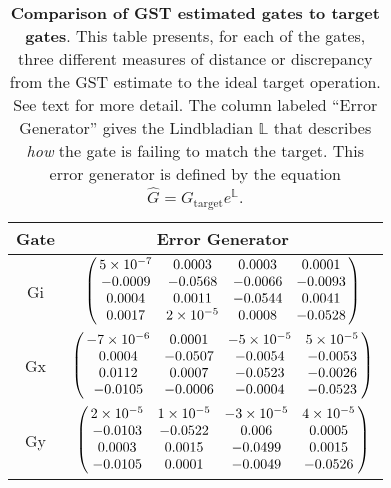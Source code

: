 {\begin{table}[h]
\begin{center}
\vspace{2em}
\begin{tabular}[l]{|c|c|}
\hline
Gate & Error Generator \\ \hline
Gi & $ \left(\!\!\begin{array}{cccc}
5\times 10^{-7} & 0.0003 & 0.0003 & 0.0001 \\ 
-0.0009 & -0.0568 & -0.0066 & -0.0093 \\ 
0.0004 & 0.0011 & -0.0544 & 0.0041 \\ 
0.0017 & 2\times 10^{-5} & 0.0008 & -0.0528
 \end{array}\!\!\right) $
 \\ \hline
Gx & $ \left(\!\!\begin{array}{cccc}
-7\times 10^{-6} & 0.0001 & -5\times 10^{-5} & 5\times 10^{-5} \\ 
0.0004 & -0.0507 & -0.0054 & -0.0053 \\ 
0.0112 & 0.0007 & -0.0523 & -0.0026 \\ 
-0.0105 & -0.0006 & -0.0004 & -0.0523
 \end{array}\!\!\right) $
 \\ \hline
Gy & $ \left(\!\!\begin{array}{cccc}
2\times 10^{-5} & 1\times 10^{-5} & -3\times 10^{-5} & 4\times 10^{-5} \\ 
-0.0103 & -0.0522 & 0.006 & 0.0005 \\ 
0.0003 & 0.0015 & -0.0499 & 0.0015 \\ 
-0.0105 & 0.0001 & -0.0049 & -0.0526
 \end{array}\!\!\right) $
 \\ \hline
\end{tabular}

\caption{\textbf{Comparison of GST estimated gates to target gates}.  This table presents, for each of the gates, three different measures of distance or discrepancy from the GST estimate to the ideal target operation.  See text for more detail.  The column labeled ``Error Generator'' gives the Lindbladian $\mathbb{L}$ that describes \emph{how} the gate is failing to match the target.  This error generator is defined by the equation $\hat{G} = G_{\mathrm{target}}e^{\mathbb{L}}$. \label{bestCPTPGatesetVsTargetTable}}
\end{center}
\end{table}

}
